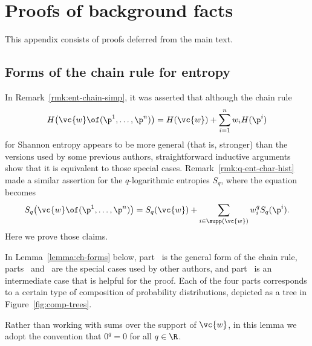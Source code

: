 \chapter{Proofs of background facts}


This appendix consists of proofs deferred from the main text.  


\section{Forms of the chain rule for entropy}


In Remark~\ref{rmk:ent-chain-simp}, it was asserted that although the
chain rule
\[
H\bigl( \vc{w} \of (\p^1, \ldots, \p^n)\bigr)
=
H(\vc{w}) + \sum_{i = 1}^n w_i H(\p^i)
\]
for Shannon entropy appears to be more general (that is, stronger) than the
versions used by some previous authors, straightforward inductive arguments
show that it is equivalent to those special cases.
Remark~\ref{rmk:q-ent-char-hist} made a similar assertion for the
$q$-logarithmic entropies $S_q$, where the equation becomes
\[
S_q\bigl( \vc{w} \of (\p^1, \ldots, \p^n)\bigr)
=
S_q(\vc{w}) + \sum_{i \in \supp(\vc{w})} w_i^q S_q(\p^i).
\]
Here we prove those claims.

In Lemma~\ref{lemma:ch-forms} below, part~ is the
general form of the chain rule, parts~
and~ are the special cases used by other authors, and
part~ is an intermediate case that is helpful for the
proof.  Each of the four parts corresponds to a certain type of composition
of probability distributions, depicted as a tree in
Figure~\ref{fig:comp-trees}.  

Rather than working with sums over the support of $\vc{w}$, in this lemma
we adopt the convention that $0^q = 0$ for all $q \in \R$.


